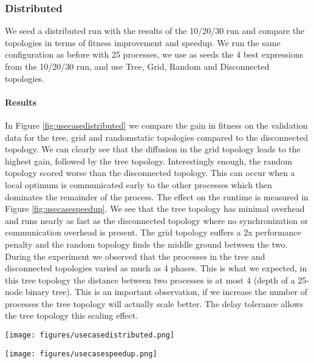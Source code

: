 \subsubsection{Distributed}
We seed a distributed run with the results of the 10/20/30 run and compare the topologies in terms of fitness improvement and speedup.
We run the same configuration as before with 25 processes, we use as seeds the 4 best expressions from the 10/20/30 run, and use Tree, Grid, Random and Disconnected topologies.
\paragraph{Results}
In Figure \ref{fig:usecasedistributed} we compare the gain in fitness on the validation data for the tree, grid and randomstatic topologies compared to the disconnected topology. We can clearly see that the diffusion in the grid topology leads to the highest gain, followed by the tree topology. Interestingly enough, the random topology scored worse than the disconnected topology. This can occur when a local optimum is communicated early to the other processes which then dominates the remainder of the process. The effect on the runtime is measured in Figure \ref{fig:usecasespeedup}. We see that the tree topology has minimal overhead and runs nearly as fast as the disconnected topology where no synchronization or communication overhead is present. The grid topology suffers a 2x performance penalty and the random topology finds the middle ground between the two. During the experiment we observed that the processes in the tree and disconnected topologies varied as much as 4 phases. This is what we expected, in this tree topology the distance between two processes is at most 4 (depth of a 25-node binary tree). This is an important observation, if we increase the number of processes the tree topology will actually scale better. The delay tolerance allows the tree topology this scaling effect.
\begin{figure*}
    \centering
    \texttt{[image: figures/usecasedistributed.png]}
    \caption{Incremental distributed CSRM applied to use case.}
    \label{fig:usecasedistributed}
\end{figure*}
\begin{figure*}
    \centering
    \texttt{[image: figures/usecasespeedup.png]}
    \caption{Runtime impact of synchronization and communication overhead.}
    \label{fig:usecasespeedup}
\end{figure*}

